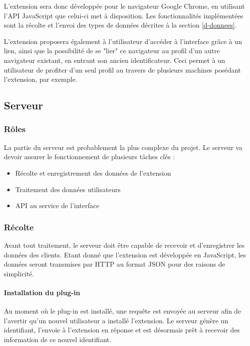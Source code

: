		L'extension sera donc développée pour le navigateur Google Chrome, en utilisant l'API JavaScript que celui-ci met à disposition. Les fonctionnalités implémentées sont la récolte et l'envoi des types de données décrites à la section \ref{d-donnees}.

		L'extension proposera également à l'utilisateur d'accéder à l'interface grâce à un lien, ainsi que la possibilité de se "lier" ce navigateur au profil d'un autre navigateur existant, en entrant son ancien identificateur. Ceci permet à un utilisateur de profiter d'un seul profil au travers de plusieurs machines posédant l'extension, par exemple. 

	\subsection{Serveur}

		\subsubsection{Rôles}

			La partie du serveur est probablement la plus complexe du projet. Le serveur va devoir assurer le fonctionnement de plusieurs tâches clés :

			\begin{itemize}
				\item Récolte et enregistrement des données de l'extension
				\item Traitement des données utilisateurs
				\item API au service de l'interface
			\end{itemize}

		\subsubsection{Récolte}

			Avant tout traitement, le serveur doit être capable de recevoir et d'enregistrer les données des clients. Etant donné que l'extension est développée en JavaScript, les données seront transmises par HTTP au format JSON pour des raisons de simplicité.

			\paragraph{Installation du plug-in}

				Au moment où le plug-in est installé, une requête est envoyée au serveur afin de l'avertir qu'un nouvel utilisateur a installé l'extension. Le serveur génère un identifiant, l'envoie à l'extension en réponse et est désormais prêt à recevoir des information de ce nouvel identifiant.

